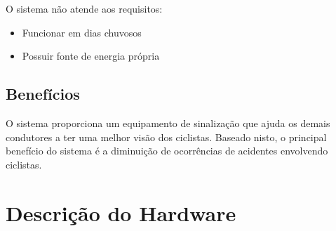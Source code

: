 \documentclass[conference]{IEEEtran}
\begin{document}
O sistema não atende aos requisitos:
\begin{itemize}
  \item Funcionar em dias chuvosos
  \item Possuir fonte de energia própria
\end{itemize}

\subsection{Benefícios}
O sistema proporciona um equipamento de sinalização que ajuda os demais condutores
a ter uma melhor visão dos ciclistas. Baseado nisto, o principal benefício do sistema
é a diminuição de ocorrências de acidentes envolvendo ciclistas.


\section{Descrição do Hardware}
\end{document}

